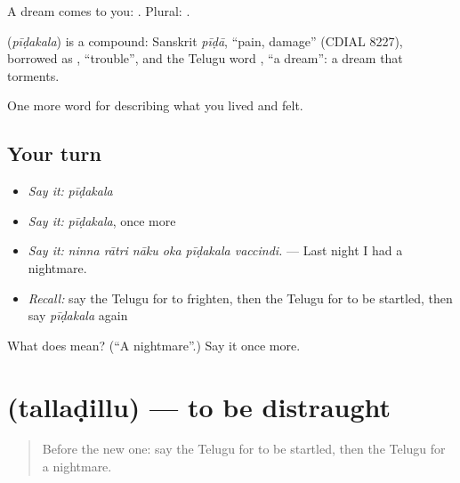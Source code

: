 A dream comes to you:   . Plural: .

\begin{cousinweb}
\textbf{} (\emph{pīḍakala}) is a compound: Sanskrit \emph{pīḍā}, \textquotedblleft{}pain, damage\textquotedblright{} (CDIAL 8227), borrowed as , \textquotedblleft{}trouble\textquotedblright{}, and the Telugu word , \textquotedblleft{}a dream\textquotedblright{}: a dream that torments.
\end{cousinweb}

\begin{grammarlens}[title={What you've built}]
One more word for describing what you lived and felt.
\end{grammarlens}

\subsection*{Your turn}
\begin{itemize}
\raggedright
  \item \emph{Say it:} \emph{pīḍakala}
  \item \emph{Say it:} \emph{pīḍakala}, once more
  \item \emph{Say it:} \emph{ninna rātri nāku oka pīḍakala vaccindi.} — Last night I had a nightmare.
  \item \emph{Recall:} say the Telugu for to frighten, then the Telugu for to be startled, then say \emph{pīḍakala} again
\end{itemize}

\begin{tcolorbox}[breakable,colback=teal!4,colframe=teal!35!black,title={Before you move on}]
What does  mean? (\textquotedblleft{}A nightmare\textquotedblright{}.) Say it once more.
\end{tcolorbox}
\section[\texorpdfstring{\te{తల్లడిల్లు} (tallaḍillu)}{తల్లడిల్లు (tallaḍillu)}]{ (tallaḍillu) — to be distraught}

\label{lesson:TE-C495-talladillu}



\begin{quote}
Before the new one: say the Telugu for to be startled, then the Telugu for a nightmare.
\end{quote}


